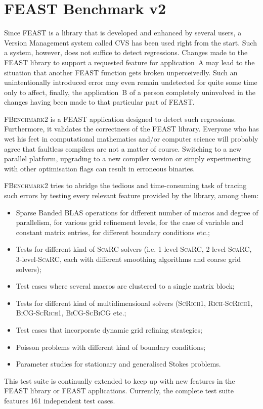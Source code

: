 \section{FEAST Benchmark v2}

Since FEAST is a library that is developed and enhanced by several users, a
Version Management system called CVS \cite{Cederquist2003} has been used right
from the start. Such a system, however, does not suffice to detect regressions.
Changes made to the FEAST library to support a requested feature for
application~A may lead to the situation that another FEAST function gets broken
unperceivedly. Such an unintentionally introduced error may even remain
undetected for quite some time only to affect, finally, the application~B of a
person completely uninvolved in the changes having been made to that particular
part of FEAST.

\textsc{FBenchmark2} is a FEAST application designed to detect such
regressions. Furthermore, it validates the correctness of the FEAST library.
Everyone who has wet his feet in computational mathematics and/or computer
science will probably agree that faultless compilers are not a matter of
course. Switching to a new parallel platform, upgrading to a new compiler
version or simply experimenting with other optimisation flags can result in
erroneous binaries.

\textsc{FBenchmark2} tries to abridge the tedious and time-consuming task
of tracing such errors by testing every relevant feature provided by the
library, among them:
\begin{itemize}
  \item Sparse Banded BLAS operations for different number of macros and
degree of parallelism, for various grid refinement levels, for the
case of variable and constant matrix entries, for different boundary
conditions etc.;
%
  \item Tests for different kind of \textsc{ScaRC} solvers (i.e.
  1-level-\textsc{ScaRC}, 2-level-\textsc{ScaRC}, 3-level-\textsc{ScaRC}, each
  with different smoothing algorithms and coarse grid solvers);
%
  \item Test cases where several macros are clustered to a single matrix block;
%
  \item Tests for different kind of multidimensional solvers
  (\textsc{ScRich1}, \textsc{Rich-ScRich1}, \textsc{BiCG-ScRich1},
  \textsc{BiCG-ScBiCG} etc.;
%
  \item Test cases that incorporate dynamic grid refining strategies;
%
  \item Poisson problems with different kind of boundary conditions;
%
  \item Parameter studies for stationary and generalised Stokes
  problems.
  \end{itemize}
This test suite is continually extended to keep up with new features
in the FEAST library or FEAST applications. Currently, the
complete test suite features 161 independent test cases.

